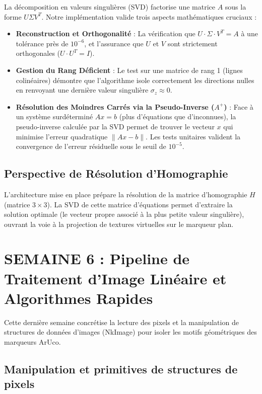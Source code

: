 \documentclass[12pt,a4paper]{report}
\begin{document}
La décomposition en valeurs singulières (SVD) factorise une matrice $A$ sous la forme $U \Sigma V^T$. Notre implémentation valide trois aspects mathématiques cruciaux :
\begin{itemize}
    \item \textbf{Reconstruction et Orthogonalité} : La vérification que $U \cdot \Sigma \cdot V^T = A$ à une tolérance près de $10^{-6}$, et l'assurance que $U$ et $V$ sont strictement orthogonales ($U \cdot U^T = I$).
    \item \textbf{Gestion du Rang Déficient} : Le test sur une matrice de rang 1 (lignes colinéaires) démontre que l'algorithme isole correctement les directions nulles en renvoyant une dernière valeur singulière $\sigma_z \approx 0$.
    \item \textbf{Résolution des Moindres Carrés via la Pseudo-Inverse ($A^+$)} : Face à un système surdéterminé $Ax = b$ (plus d'équations que d'inconnues), la pseudo-inverse calculée par la SVD permet de trouver le vecteur $x$ qui minimise l'erreur quadratique $\|Ax - b\|$. Les tests unitaires valident la convergence de l'erreur résiduelle sous le seuil de $10^{-5}$.
\end{itemize}

\section{Perspective de Résolution d'Homographie}

L'architecture mise en place prépare la résolution de la matrice d'homographie $H$ (matrice $3 \times 3$). La SVD de cette matrice d'équations permet d'extraire la solution optimale (le vecteur propre associé à la plus petite valeur singulière), ouvrant la voie à la projection de textures virtuelles sur le marqueur plan.



\chapter{SEMAINE 6 : Pipeline de Traitement d'Image Linéaire et Algorithmes Rapides}

Cette dernière semaine concrétise la lecture des pixels et la manipulation de structures de données d'images (NkImage) pour isoler les motifs géométriques des marqueurs ArUco.

\section{Manipulation et primitives de structures de pixels}
\end{document}
